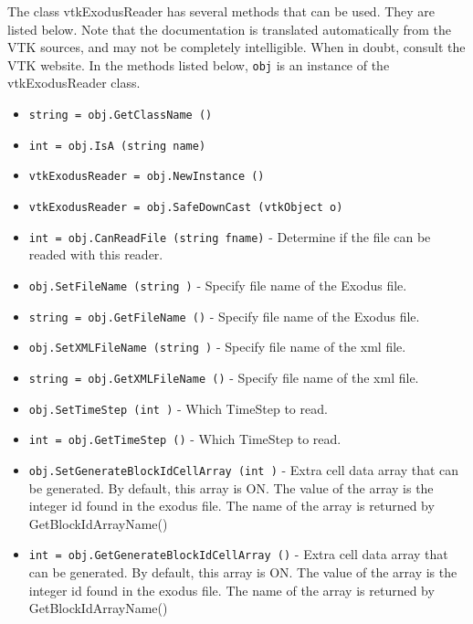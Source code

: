 The class vtkExodusReader has several methods that can be used.
  They are listed below.
Note that the documentation is translated automatically from the VTK sources,
and may not be completely intelligible.  When in doubt, consult the VTK website.
In the methods listed below, \verb|obj| is an instance of the vtkExodusReader class.
\begin{itemize}
\item  \verb|string = obj.GetClassName ()|

\item  \verb|int = obj.IsA (string name)|

\item  \verb|vtkExodusReader = obj.NewInstance ()|

\item  \verb|vtkExodusReader = obj.SafeDownCast (vtkObject o)|

\item  \verb|int = obj.CanReadFile (string fname)| -  Determine if the file can be readed with this reader.

\item  \verb|obj.SetFileName (string )| -  Specify file name of the Exodus file.

\item  \verb|string = obj.GetFileName ()| -  Specify file name of the Exodus file.

\item  \verb|obj.SetXMLFileName (string )| -  Specify file name of the xml file.

\item  \verb|string = obj.GetXMLFileName ()| -  Specify file name of the xml file.

\item  \verb|obj.SetTimeStep (int )| -  Which TimeStep to read.    

\item  \verb|int = obj.GetTimeStep ()| -  Which TimeStep to read.    

\item  \verb|obj.SetGenerateBlockIdCellArray (int )| -  Extra cell data array that can be generated.  By default, this array
 is ON.  The value of the array is the integer id found
 in the exodus file. The name of the array is returned by 
 GetBlockIdArrayName()

\item  \verb|int = obj.GetGenerateBlockIdCellArray ()| -  Extra cell data array that can be generated.  By default, this array
 is ON.  The value of the array is the integer id found
 in the exodus file. The name of the array is returned by 
 GetBlockIdArrayName()


\end{itemize}
